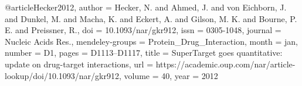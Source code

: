 @article{Hecker2012,
author = {Hecker, N. and Ahmed, J. and von Eichborn, J. and Dunkel, M. and Macha, K. and Eckert, A. and Gilson, M. K. and Bourne, P. E. and Preissner, R.},
doi = {10.1093/nar/gkr912},
issn = {0305-1048},
journal = {Nucleic Acids Res.},
mendeley-groups = {Protein{\_}Drug{\_}Interaction},
month = {jan},
number = {D1},
pages = {D1113--D1117},
title = {{SuperTarget goes quantitative: update on drug-target interactions}},
url = {https://academic.oup.com/nar/article-lookup/doi/10.1093/nar/gkr912},
volume = {40},
year = {2012}
}
